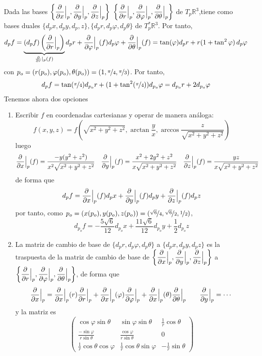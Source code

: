 \begin{sol}
    Dada las bases $\left\{\dfrac{\partial^{} }{\partial x}\Big|_p, \dfrac{\partial^{} }{\partial y}\Big|_p, \dfrac{\partial^{} }{\partial z}\Big|_p\right\}$ $\left\{\dfrac{\partial^{} }{\partial r}\Big|_p, \dfrac{\partial^{} }{\partial \varphi}\Big|_p, \dfrac{\partial^{} }{\partial \theta}\Big|_p\right\}$ de $T_p\mathbb R^3$,tiene como bases duales $\{d_px,d_py,d_p,z\}, \{d_pr, d_p\varphi, d_p\theta\}$ de $T_p^*\mathbb R^3$. Por tanto,
    $$d_pf= \underbrace{(d_pf) \left(\frac{\partial}{\partial r}\Big|_p\right)}_{\frac{\partial}{\partial r}|_p(f)}d_pr + \dfrac{\partial^{} }{\partial \varphi}\Big|_p(f) d_p\varphi + \dfrac{\partial^{} }{\partial \theta}\Big|_p (f) = \tan(\varphi) d_pr + r(1+\tan^2\varphi) \, d_p\varphi$$
    con $p_o=(r(p_o), \varphi(p_o), \theta(p_o) ) = (1, \nicefrac{\pi}{4}, \nicefrac{\pi}{3})$. Por tanto, 
    $$d_pf = \tan (\nicefrac{\pi}{4}) d_{p_o}r + (1+\tan^2(\nicefrac{\pi}{4})) d_{p_o}\varphi = d_{p_o}r+2d_{p_o}\varphi$$
    Tenemos ahora dos opciones
    \begin{enumerate}
        \item Escribir $f$ en coordenadas cartesianas y operar de manera an\'aloga:
        $$f(x,y,z) = f\left(\sqrt{x^2+y^2+z^2}, \arctan \frac{y}{x}, \arccos  \frac{z}{\sqrt{x^2+y^2+z^2}}\right) $$luego 
        $$\dfrac{\partial^{} }{\partial x} \Big|_p (f)= \dfrac{-y(y^2+z^2)}{x^2\sqrt{x^2+y^2+z^2}} \quad \dfrac{\partial^{} }{\partial y} \Big|_p (f)= \dfrac{x^2+2y^2+z^2}{x\sqrt{x^2+y^2+z^2}}\quad \dfrac{\partial^{} }{\partial z} \Big|_p (f)= \dfrac{yz}{x\sqrt{x^2+y^2+z^2}}$$
        de forma que 
        $$d_pf = \dfrac{\partial^{} }{\partial x}\Big|_p(f) d_px + \dfrac{\partial^{} }{\partial y}\Big|_p(f) d_py + \dfrac{\partial^{} }{\partial z}\Big|_p(f) d_pz
        $$
        por tanto, como $p_o=(x(p_o),y(p_o),z(p_o))=(\nicefrac{\sqrt{6}}{4}, \nicefrac{\sqrt{6}}{2}, \nicefrac{1}{2})$, 
        $$d_{p_o}f =-\dfrac{5\sqrt{6}}{12} d_{p_o}x+\dfrac{11\sqrt{6}}{12} d_{p_o}y+\dfrac{1}{2} d_{p_o}z$$
        \item La matriz de cambio de base de $\{d_pr,d_p\varphi, d_p \theta\}$ a $\{d_px,d_py,d_pz\}$ es la traspuesta de la matriz de cambio de base de $\left\{\dfrac{\partial^{} }{\partial x}\Big|_p, \dfrac{\partial^{} }{\partial y}\Big|_p, \dfrac{\partial^{} }{\partial z}\Big|_p\right\}$ a $\left\{\dfrac{\partial^{} }{\partial r}\Big|_p, \dfrac{\partial^{} }{\partial \varphi}\Big|_p, \dfrac{\partial^{} }{\partial \theta}\Big|_p\right\}$, de forma que 
        $$\dfrac{\partial^{} }{\partial x} \Big|_p = \dfrac{\partial^{} }{\partial x} \Big|_p (r) \dfrac{\partial^{} }{\partial r} \Big|_p  + \dfrac{\partial^{} }{\partial x} \Big|_p (\varphi) \dfrac{\partial^{} }{\partial \varphi} \Big|_p + \dfrac{\partial^{} }{\partial x} \Big|_p (\theta) \dfrac{\partial^{} }{\partial \theta} \Big|_p \qquad \dfrac{\partial^{} }{\partial y} \Big|_p=\cdots $$
        y la matriz es 
        $$\begin{pmatrix}
            \cos  \varphi\sin \theta &\sin \varphi\sin \theta & \frac{1}{r} \cos  \theta \\ \frac{-\sin \varphi}{r\sin \theta} & \frac{ \cos \varphi}{r\sin \theta} & 0 \\ \frac{1}{r} \cos  \theta \cos  \varphi & \frac{1}{r}  \cos  \theta\sin \varphi & -\frac{1}{r}\sin \theta
        \end{pmatrix}$$
    \end{enumerate}
\end{sol}
